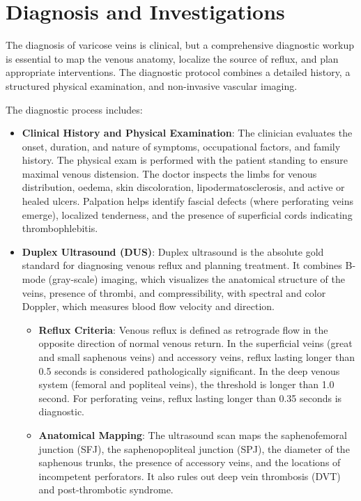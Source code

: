 \section*{Diagnosis and Investigations}
The diagnosis of varicose veins is clinical, but a comprehensive diagnostic workup is essential to map the venous anatomy, localize the source of reflux, and plan appropriate interventions. The diagnostic protocol combines a detailed history, a structured physical examination, and non-invasive vascular imaging.

The diagnostic process includes:
\begin{itemize}
\item \textbf{Clinical History and Physical Examination}: The clinician evaluates the onset, duration, and nature of symptoms, occupational factors, and family history. The physical exam is performed with the patient standing to ensure maximal venous distension. The doctor inspects the limbs for venous distribution, oedema, skin discoloration, lipodermatosclerosis, and active or healed ulcers. Palpation helps identify fascial defects (where perforating veins emerge), localized tenderness, and the presence of superficial cords indicating thrombophlebitis.
\item \textbf{Duplex Ultrasound (DUS)}: Duplex ultrasound is the absolute gold standard for diagnosing venous reflux and planning treatment. It combines B-mode (gray-scale) imaging, which visualizes the anatomical structure of the veins, presence of thrombi, and compressibility, with spectral and color Doppler, which measures blood flow velocity and direction.
    \begin{itemize}
    \item \textbf{Reflux Criteria}: Venous reflux is defined as retrograde flow in the opposite direction of normal venous return. In the superficial veins (great and small saphenous veins) and accessory veins, reflux lasting longer than 0.5 seconds is considered pathologically significant. In the deep venous system (femoral and popliteal veins), the threshold is longer than 1.0 second. For perforating veins, reflux lasting longer than 0.35 seconds is diagnostic.
    \item \textbf{Anatomical Mapping}: The ultrasound scan maps the saphenofemoral junction (SFJ), the saphenopopliteal junction (SPJ), the diameter of the saphenous trunks, the presence of accessory veins, and the locations of incompetent perforators. It also rules out deep vein thrombosis (DVT) and post-thrombotic syndrome.
    \end{itemize}

\end{itemize}
